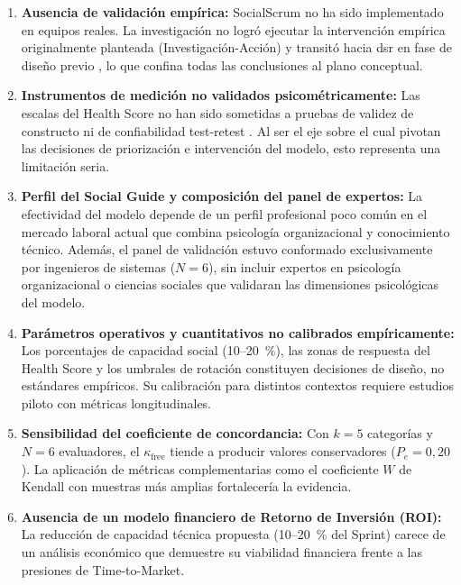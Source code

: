 \begin{enumerate}
    \item \textbf{Ausencia de validación empírica:} SocialScrum no ha sido implementado en equipos reales. La investigación no logró ejecutar la intervención empírica originalmente planteada (Investigación-Acción) y transitó hacia \gls{dsr} en fase de diseño previo \cite{hevner2004designscience, peffers2007dsrm, wieringa2014dsr}, lo que confina todas las conclusiones al plano conceptual.

    \item \textbf{Instrumentos de medición no validados psicométricamente:} Las escalas del Health Score no han sido sometidas a pruebas de validez de constructo ni de confiabilidad test-retest \cite{nunnally1994psychometric}. Al ser el eje sobre el cual pivotan las decisiones de priorización e intervención del modelo, esto representa una limitación seria.

    \item \textbf{Perfil del Social Guide y composición del panel de expertos:} La efectividad del modelo depende de un perfil profesional poco común en el mercado laboral actual que combina psicología organizacional y conocimiento técnico. Además, el panel de validación estuvo conformado exclusivamente por ingenieros de sistemas ($N = 6$), sin incluir expertos en psicología organizacional o ciencias sociales que validaran las dimensiones psicológicas del modelo.

    \item \textbf{Parámetros operativos y cuantitativos no calibrados empíricamente:} Los porcentajes de capacidad social (10--20~\%), las zonas de respuesta del Health Score y los umbrales de rotación constituyen decisiones de diseño, no estándares empíricos. Su calibración para distintos contextos requiere estudios piloto con métricas longitudinales.

    \item \textbf{Sensibilidad del coeficiente de concordancia:} Con $k = 5$ categorías y $N = 6$ evaluadores, el $\kappa_{\text{free}}$ tiende a producir valores conservadores ($P_e = 0{,}20$). La aplicación de métricas complementarias como el coeficiente $W$ de Kendall \cite{Kendall1948} con muestras más amplias fortalecería la evidencia.

    \item \textbf{Ausencia de un modelo financiero de Retorno de Inversión (ROI):} La reducción de capacidad técnica propuesta (10--20~\% del Sprint) carece de un análisis económico que demuestre su viabilidad financiera frente a las presiones de Time-to-Market.


\end{enumerate}
